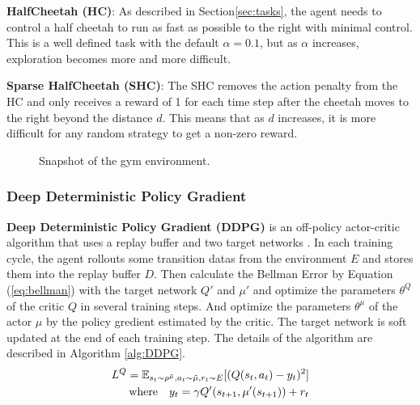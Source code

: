 \textbf{HalfCheetah (HC)}: As described in Section\ref{sec:tasks}, the agent needs to control a half cheetah to run as fast as possible to the right with minimal control. This is a well defined task with the default $\alpha = 0.1$, but as $\alpha$ increases, exploration becomes more and more difficult.

\textbf{Sparse HalfCheetah (SHC)}: The SHC removes the action penalty from the HC and only receives a reward of 1 for each time step after the cheetah moves to the right beyond the distance $d$. This means that as $d$ increases, it is more difficult for any random strategy to get a non-zero reward.

\begin{figure}[htb]
   \centering  
   \caption{Snapshot of the gym environment.}
   \label{fig:MC}
\end{figure}

\subsubsection{Deep Deterministic Policy Gradient}
\textbf{Deep Deterministic Policy Gradient (DDPG)} is an off-policy actor-critic algorithm that uses a replay buffer and two target networks \cite{DDPG}. In each training cycle, the agent rollouts some  transition datas from the environment $E$ and stores them into the replay buffer $D$. Then calculate the Bellman Error by Equation (\ref{eq:bellman}) with the target network $Q'$ and $\mu'$ and optimize the parameters $\theta^{Q}$ of the critic $Q$ in several training steps. And optimize the parameters $\theta^{\mu}$ of the actor $\mu$ by the policy gredient estimated by the critic. The target network is soft updated at the end of each training step. The details of the algorithm are described in Algorithm \ref{alg:DDPG}.
\begin{equation}
   \label{eq:bellman} 
   \begin{aligned}
   L^Q=\mathbb{E}_{s_t\sim\rho^{\tilde\mu},a_t\sim\tilde\mu,r_t\sim E}[(Q(s_t,a_t)-y_t)^2]\\
   \text{where\quad}  y_t = \gamma Q'(s_{t+1},\mu'(s_{t+1}))+r_t
   \end{aligned}
\end{equation}

